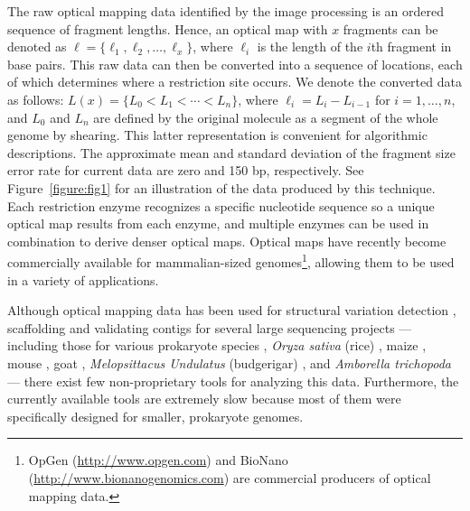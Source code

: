 \documentclass[doctor]{thesis}
\begin{document}
The raw optical mapping data identified by the image processing is an ordered sequence of fragment lengths. Hence, an optical map with $x$ fragments can be denoted as $\ell = \{\ell_1, \ell_2, \ldots, \ell_x \}$, where $\ell_i$ is the length of the $i$th fragment in base pairs.  This raw data can then be converted into a sequence of locations, each of which determines where a restriction site occurs.  We denote the converted data as follows: $L(x) = \{L_0 < L_1 < \cdots < L_n \}$, where $\ell_i = L_i - L_{i - 1}$ for $i = 1, \ldots, n$, and  $L_0$ and $L_n$ are defined by the original molecule as a segment of the whole genome by shearing. This latter representation is convenient for algorithmic descriptions. The approximate mean and standard deviation of the fragment size error rate for current data \cite{error_rate} are zero and 150 bp, respectively.   See Figure~\ref{figure:fig1} for an illustration of the data produced by this technique.   
Each restriction enzyme recognizes a specific nucleotide sequence so a unique optical map results from each enzyme, and multiple enzymes can be used in combination to derive denser optical maps.  Optical maps have recently become commercially available for mammalian-sized genomes\footnote{OpGen (\url{http://www.opgen.com}) and BioNano (\url{http://www.bionanogenomics.com}) are commercial producers of optical mapping data.}, allowing them to be used in a variety of applications. 











Although optical mapping data has been used for structural variation detection \cite{teague}, scaffolding and validating contigs for several large sequencing projects --- including those for various prokaryote species \cite{reslewic,zhou,zhou2}, {\em Oryza sativa} (rice) \cite{RICE}, maize \cite{Zhou09}, mouse \cite{church}, goat \cite{GOAT}, {\em Melopsittacus Undulatus} (budgerigar) \cite{gigadb}, and {\em Amborella trichopoda} \cite{amborella} --- there exist few non-proprietary tools for analyzing this data. Furthermore, the currently available tools are extremely slow because most of them were specifically designed for smaller, prokaryote genomes.  
\end{document}
